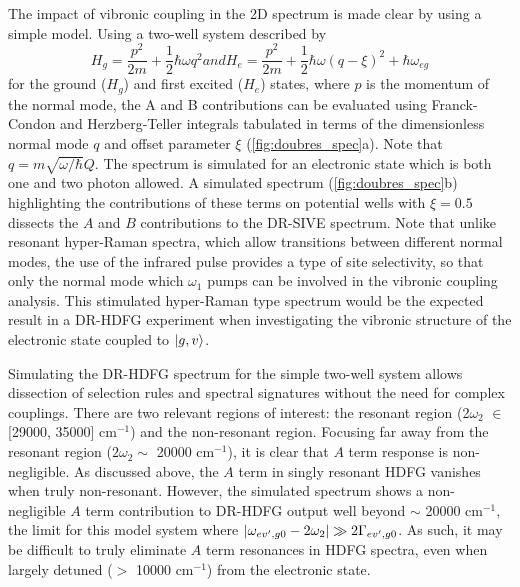\documentclass[aip, jcp, reprint, onecolumn]{revtex4-2}
\begin{document}
The impact of vibronic coupling in the 2D spectrum is made clear by using a simple model. \cite{Kundu2022}
Using a two-well system described by 
\begin{subequations}
	\begin{equation}
		H_g = \frac{p^2}{2m} + \frac{1}{2} \hbar \omega q^2
	\end{equation}
and
	\begin{equation}
		H_e = \frac{p^2}{2m} + \frac{1}{2} \hbar \omega (q-\xi)^2 +\hbar \omega_{eg}
	\end{equation}
\end{subequations}
for the ground ($H_g$) and first excited ($H_e$) states, where $p$ is the momentum of the normal mode, the A and B contributions can be evaluated using Franck-Condon and Herzberg-Teller integrals tabulated in terms of the dimensionless normal mode $q$ and offset parameter $\xi$ (\autoref{fig:doubres_spec}a). \cite{Carlson1988thesis} 
Note that $q = m \sqrt{\omega/\hbar} Q$.
The spectrum is simulated for an electronic state which is both one and two photon allowed.
A simulated spectrum   (\autoref{fig:doubres_spec}b) highlighting the contributions of these terms on potential wells with $\xi = 0.5$ dissects the $A$ and $B$ contributions to the DR-SIVE spectrum.
Note that unlike resonant hyper-Raman spectra, which allow transitions between different normal modes, the use of the infrared pulse provides a type of site selectivity,\cite{RN103} so that only the normal mode which $\omega_1$ pumps can be involved in the vibronic coupling analysis.
This stimulated hyper-Raman type spectrum would be the expected result in a DR-HDFG experiment when investigating the vibronic structure of the electronic state coupled to $\ket{g,v}$.

Simulating the DR-HDFG spectrum for the simple two-well system allows dissection of selection rules and spectral signatures without the need for complex couplings.
There are two relevant regions of interest: the resonant region (2$\omega_2$ $\in$ [29000, 35000] cm$^{-1}$) and the non-resonant region.
Focusing far away from the resonant region ($2\omega_2 \sim$ 20000 cm$^{-1}$), it is clear that $A$ term response is non-negligible. 
As discussed above, the $A$ term in singly resonant HDFG vanishes when truly non-resonant.
However, the simulated spectrum shows a non-negligible $A$ term contribution to DR-HDFG output well beyond $\sim$ 20000 cm$^{-1}$, the limit for this model system where $\abs{\omega_{ev',g0} - 2\omega_2} \gg 2\Gamma_{ev',g0}$.
As such, it may be difficult to truly eliminate $A$ term resonances in HDFG spectra, even when largely detuned ($>$ 10000 cm$^{-1}$) from the electronic state. 
\end{document}
